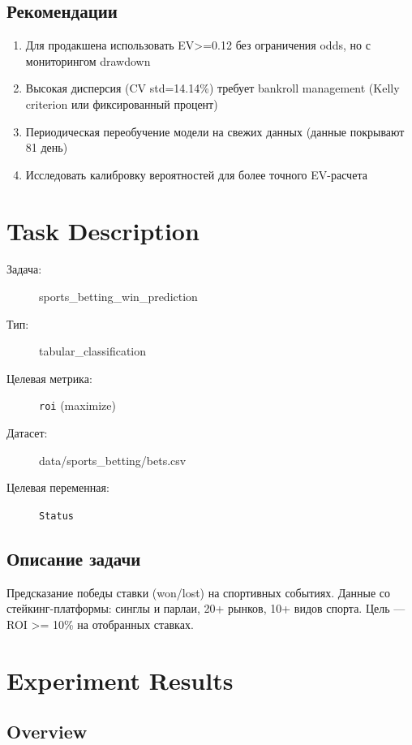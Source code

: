 \documentclass[12pt,a4paper]{article}
\begin{document}
\subsection{Рекомендации}
\begin{enumerate}
  \item Для продакшена использовать EV>=0.12 без ограничения odds, но с мониторингом drawdown
  \item Высокая дисперсия (CV std=14.14\%) требует bankroll management (Kelly criterion или фиксированный процент)
  \item Периодическая переобучение модели на свежих данных (данные покрывают 81 день)
  \item Исследовать калибровку вероятностей для более точного EV-расчета
\end{enumerate}




\section{Task Description}

\begin{description}
    \item[Задача:] sports\_betting\_win\_prediction
    \item[Тип:] tabular\_classification
    \item[Целевая метрика:] \texttt{roi}
        (maximize)
    \item[Датасет:] data/sports\_betting/bets.csv
    \item[Целевая переменная:] \texttt{Status}
\end{description}

\subsection*{Описание задачи}
Предсказание победы ставки (won/lost) на спортивных событиях. Данные со стейкинг-платформы: синглы и парлаи, 20+ рынков, 10+ видов спорта. Цель — ROI >= 10\% на отобранных ставках.




\section{Experiment Results}

\subsection{Overview}
\end{document}

